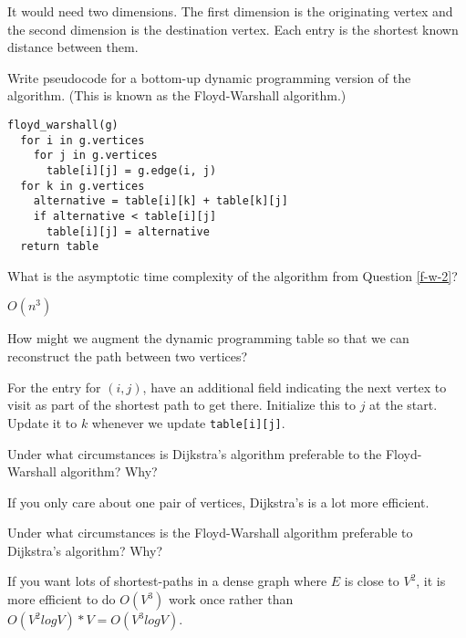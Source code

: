 \documentclass{tufte-handout}
\begin{document}
\begin{questions}
{\color{red} It would need two dimensions. The first dimension is the originating vertex and the second dimension is the destination vertex. Each entry is the shortest known distance between them.}

\item Write pseudocode for a bottom-up dynamic programming version of the algorithm. (This is known as the Floyd-Warshall algorithm.) \label{f-w-2}

{\color{red}
\begin{verbatim}
floyd_warshall(g)
  for i in g.vertices
    for j in g.vertices
      table[i][j] = g.edge(i, j)
  for k in g.vertices
    alternative = table[i][k] + table[k][j]
    if alternative < table[i][j]
      table[i][j] = alternative
  return table
\end{verbatim}
}

\item What is the asymptotic time complexity of the algorithm from Question \ref{f-w-2}?

{\color{red} $O(n^3)$}

\item How might we augment the dynamic programming table so that we can reconstruct the path between two vertices?

{\color{red} For the entry for $(i, j)$, have an additional field indicating the next vertex to visit as part of the shortest path to get there. Initialize this to $j$ at the start. Update it to $k$ whenever we update \verb|table[i][j]|.}

\item Under what circumstances is Dijkstra's algorithm preferable to the Floyd-Warshall algorithm? Why?

{\color{red} If you only care about one pair of vertices, Dijkstra's is a lot more efficient.}

\item Under what circumstances is the Floyd-Warshall algorithm preferable to Dijkstra's algorithm? Why?

{\color{red} If you want lots of shortest-paths in a dense graph where $E$ is close to $V^2$, it is more efficient to do $O(V^3)$ work once rather than $O(V^2 log V) * V = O(V^3 log V)$.}
\end{questions}
\end{document}
